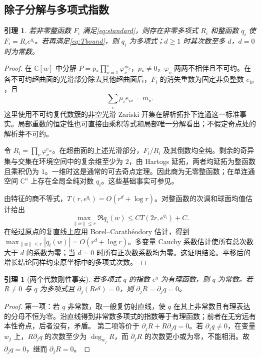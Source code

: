 \documentclass[UTF8,11pt,a4paper,fontset=fandol]{ctexart}
\newtheorem{lemma}[theorem]{引理}
\theoremstyle{definition}\newtheorem{definition}[theorem]{定义}
\theoremstyle{remark}\newtheorem{remark}[theorem]{注}
\newcommand{\C}{\mathbb C}\newcommand{\N}{\mathbb N}
\begin{document}
\subsection{除子分解与多项式指数}
\begin{lemma}\label{lem:factor}
若非零整函数 $F_i$ 满足\eqref{eq:standard}，则存在非零多项式 $R_i$ 和整函数 $q_i$ 使 $F_i=R_i e^{q_i}$。若再满足\eqref{eq:Tbound}，则 $q_i$ 为多项式；$d\ge1$ 时其次数至多 $d$，$d=0$ 时为常数。
\end{lemma}
\begin{proof}
在 $\C[w]$ 中分解 $P=p_*\prod_{\nu=1}^s\varphi_\nu^{m_\nu}$，$p_*\ne0$，$\varphi_\nu$ 两两不相伴且不可约。在各不可约超曲面的光滑部分除去其他超曲面后，$F_i$ 的消失重数为固定非负整数 $e_{i\nu}$，且
\begin{equation}\label{eq:allocation}
\sum_i\mu_i e_{i\nu}=m_\nu.
\end{equation}
这里使用不可约复代数簇的非空光滑 Zariski 开集在解析拓扑下连通这一标准事实。局部重数的恒定性也可直接由乘积等式和局部唯一分解看出；不假定奇点处的解析芽不可约。

令 $R_i=\prod_\nu\varphi_\nu^{e_{i\nu}}$。在超曲面的上述光滑部分，$F_i/R_i$ 及其倒数均全纯。剩余的奇异集与交集在环境空间中的复余维至少为 $2$，由 Hartogs 延拓，两者均延拓为整函数且乘积仍为 $1$。一维时这是通常的可去奇点定理。因此商为无零整函数；在单连通空间 $\C^n$ 上存在全局全纯对数 $q_i$。这些基础事实可参见\cite{GR1965}。

由特征的商不等式，$T(r,e^{q_i})=O(r^d+\log r)$。对整函数的次调和球面均值估计给出
\[
\max_{\|w\|\le r}\Re q_i(w)\le C T(2r,e^{q_i})+C.
\]
在经过原点的复直线上应用 Borel--Carath\'eodory 估计，得到 $\max_{\|w\|\le r}|q_i(w)|=O(r^d+\log r)$。多变量 Cauchy 系数估计使所有总次数大于 $d$ 的系数为零；当 $d=0$ 时所有正次数系数均为零。这证明结论。平移后的增长结论同样约束原坐标中的多项式次数。
\end{proof}

\begin{lemma}[两个代数刚性事实]\label{lem:rigid}
若多项式 $q$ 的指数 $e^q$ 为有理函数，则 $q$ 为常数。若 $R\ne0$ 与 $q$ 为多项式且 $\partial_j(Re^q)=0$，则 $\partial_jR=\partial_jq=0$。
\end{lemma}
\begin{proof}
第一项：若 $q$ 非常数，取一般复仿射直线，使 $q$ 在其上非常数且有理表达的分母不恒为零。沿直线得到非常数多项式的指数等于有理函数；前者在无穷远有本性奇点，后者没有，矛盾。
第二项等价于 $\partial_jR+R\partial_jq=0$。若 $\partial_jq\ne0$，在变量 $w_j$ 上，$R\partial_jq$ 的次数至少为 $\deg_{w_j}R$，而 $\partial_jR$ 的次数更小或为零，不能相消。故 $\partial_jq=0$，继而 $\partial_jR=0$。
\end{proof}
\end{document}
